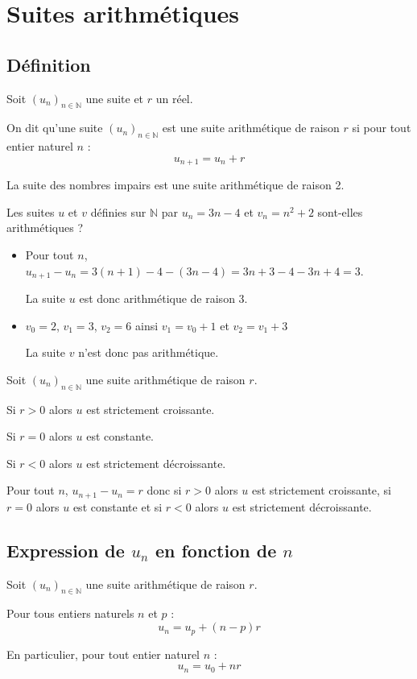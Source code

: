 \documentclass[french]{book}
\newcommand{\N}{\mathbb {N}}
\newcommand{\suite}[1][u]{\left( #1_{n} \right)_{n\in\N}}
\begin{document}
\section{Suites arithmétiques}
\subsection{Définition}
\begin{defn}
Soit $\suite[u]$ une suite et $r$ un réel.
 
On dit qu'une suite $\suite[u]$ est une suite arithmétique de raison $r$ si pour tout entier naturel $n$ : \[u_{n+1}=u_n+r\]
\end{defn}

\begin{exemple}
La suite des nombres impairs est une suite arithmétique de raison 2.

Les suites $u$ et $v$ définies sur $\N$ par $u_n=3n-4$ et $v_n=n^2+2$ sont-elles arithmétiques ?

\begin{itemize}
\item Pour tout $n$, $u_{n+1}-u_n=3(n+1)-4-(3n-4)=3n+3-4-3n+4=3$.

La suite $u$ est donc arithmétique de raison 3.

\item $v_0=2$, $v_1=3$, $v_2=6$ ainsi $v_1=v_0+1$ et $v_2=v_1+3$

La suite $v$ n'est donc pas arithmétique.
\end{itemize}
\end{exemple}

\vspace{2ex}
\begin{prop}
Soit $\suite[u]$ une suite arithmétique de raison $r$.
\par Si $r>0$ alors $u$ est strictement croissante.
\par Si $r=0$ alors $u$ est constante.
\par Si $r<0$ alors $u$ est strictement décroissante.
\end{prop}

\begin{demo}
Pour tout $n$, $u_{n+1}-u_n=r$
donc si  $r>0$ alors $u$ est strictement croissante, si $r=0$ alors $u$ est constante et si $r<0$ alors $u$ est strictement décroissante.
\end{demo}
\subsection{Expression de $u_n$ en fonction de $n$}
\begin{prop}
Soit $\suite[u]$ une suite arithmétique de raison $r$.
\par Pour tous entiers naturels $n$ et $p$ : \[u_n=u_p+(n-p)r\]
\par En particulier, pour tout entier naturel $n$ : \[u_n=u_0+nr\]
\end{prop}
\end{document}
